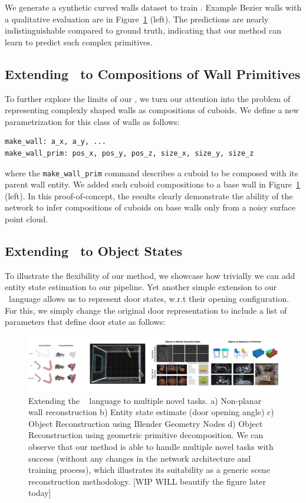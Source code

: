 We generate a synthetic curved walls dataset to train \METHOD.
Example Bezier walls with a qualitative evaluation are in Figure~\ref{fig:extensions} (left).
The predictions are nearly indistinguishable compared to ground truth,
indicating that our method can learn to predict such complex primitives.

\subsection{Extending \METHOD~to Compositions of Wall Primitives}

To further explore the limits of our \METHOD,
we turn our attention into the problem of representing complexly shaped walls
as compositions of cuboids.
We define a new parametrization for this class of walls as follows:
\begin{lstlisting}[language=StructuredLanguage]
make_wall: a_x, a_y, ...
make_wall_prim: pos_x, pos_y, pos_z, size_x, size_y, size_z
\end{lstlisting}
where the \lstinline[style=cmdstyle]!make_wall_prim! command describes a cuboid
to be composed with its parent wall entity.
We added such cuboid compositions to a base wall
in Figure~\ref{fig:extensions} (left).
In this proof-of-concept,
the results clearly demonstrate the ability of the network
to infer compositions of cuboids on base walls
only from a noisy surface point cloud.


  
\subsection{Extending \METHOD~to Object States}

To illustrate the flexibility of our method, we showcase how trivially we can add entity state estimation to our pipeline. Yet another simple extension to our \METHOD~language allows us to represent door states, w.r.t their opening configuration. For this, we simply change the original door representation to include a list of parameters that define door state as follows:

\begin{figure}[t]
    \centering
    \includegraphics[width=\textwidth]{figs/new_final.jpg}
    \caption{Extending the \METHOD~ language to multiple novel tasks. a) Non-planar wall reconstruction b) Entity state estimate (door opening angle) c) Object Reconstruction using Blender Geometry Nodes d) Object Reconstruction using geometric primitive decomposition. We can observe that our method is able to handle multiple novel tasks with success (without any changes in the network architecture and training process), which illustrates its suitability as a generic scene reconstruction methodology. [WIP WILL beautify the figure later today]}
    \label{fig:extensions}
\end{figure}


